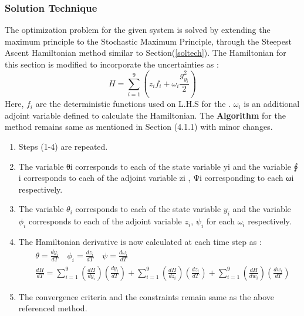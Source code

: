 \documentclass[3p,times]{elsarticle}
\begin{document}
\subsubsection{Solution Technique}
The optimization problem for the given system is solved by extending the maximum principle to the Stochastic Maximum Principle\cite{ramirez}, through the Steepest Ascent Hamiltonian method similar to Section(\ref{soltech}).
The Hamiltonian for this section is modified to incorporate the uncertainties as\cite{yenkie} :
\begin{equation}
H = \sum_{i=1}^{9} \left( z_{i}f_{i} + \omega_{i}\frac{g_{y_{i}}^2}{2} \right)
\end{equation}
Here, $f_{i}$ are the deterministic functions used on L.H.S for the . $\omega_{i}$ is an additional adjoint variable defined to calculate the Hamiltonian.
The \textbf{Algorithm} for the method remains same as mentioned in Section (4.1.1) with minor changes.
\begin{enumerate}
\item  Steps (1-4) are repeated. 
\item The variable θi corresponds to each of the state variable yi and the variable ∮ i corresponds to each of the adjoint variable zi , Ψi corresponding to each ωi respectively.
\item The variable $\theta_{i}$ corresponds to each of the state variable $y_{i}$ and the variable $\phi_{i}$ corresponds to each of the adjoint variable $z_{i}$, $\psi_{i}$ for each $\omega_{i}$ respectively.

\item The Hamiltonian derivative is now calculated at each time step  as :
\begin{align}
&\theta = \frac{dy_{i}}{dT} \quad \phi_{i} = \frac{dz_{i}}{dT} \quad \psi = \frac{d\omega_{i}}{dT} \\
&\frac{dH}{dT} = \sum_{i=1}^{9} \left( \frac{dH}{dy_{i}}\right)\left(	\frac{dy_{i}}{dT} \right) + \sum_{i=1}^{9} \left(\frac{dH}{dz_{i}}\right)\left(\frac{dz_{i}}{dT} \right) + \sum_{i=1}^{9} \left(\frac{dH}{dw_{i}}\right)\left(\frac{dw_{i}}{dT} \right)
\end{align}
\item The convergence criteria and the constraints remain same as the above referenced method.
\end{enumerate} 
\end{document}
